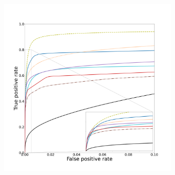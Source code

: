\begin{figure}[!ht]
  \begin{subfigure}[t]{0.78\textwidth}
    \centering
  \includegraphics[width=\textwidth,clip = true, trim  =  125 125 180 200]{Images/Vascu_4_ROC.pdf}
\end{subfigure}
\begin{subfigure}[t]{0.2\textwidth}

\end{subfigure}
\end{figure}
